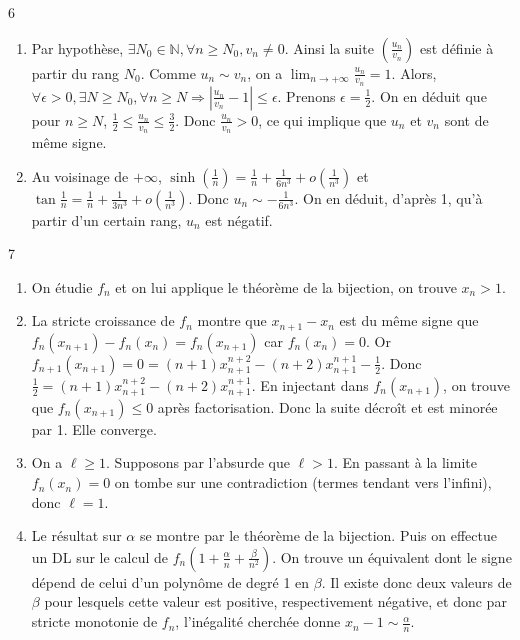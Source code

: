 \begin{correction}{6}
\begin{enumerate}
    \item 
    Par hypothèse, $\exists N_{0}\in\mathbb{N}, \forall n\ge N_{0}, v_{n}\ne0$.
    Ainsi la suite $(\frac{u_{n}}{v_{n}})$ est définie à partir du rang $N_{0}$.
    Comme $u_{n}\sim v_{n}$, on a $\lim_{n\rightarrow+\infty}\frac{u_{n}}{v_{n}}=1$.
    Alors, $\forall\epsilon>0, \exists N\ge N_{0}, \forall n\ge N \Rightarrow |\frac{u_{n}}{v_{n}}-1|\le\epsilon$.
    Prenons $\epsilon=\frac{1}{2}$. On en déduit que pour $n \ge N$, $\frac{1}{2} \le \frac{u_n}{v_n} \le \frac{3}{2}$.
    Donc $\frac{u_{n}}{v_{n}}>0$, ce qui implique que $u_{n}$ et $v_{n}$ sont de même signe.

    \item
    Au voisinage de $+\infty$, $\sinh(\frac{1}{n})=\frac{1}{n}+\frac{1}{6n^{3}}+o(\frac{1}{n^{3}})$ et $\tan\frac{1}{n}=\frac{1}{n}+\frac{1}{3n^{3}}+o(\frac{1}{n^{3}})$.
    Donc $u_{n}\sim -\frac{1}{6n^{3}}$.
    On en déduit, d'après 1, qu'à partir d'un certain rang, $u_{n}$ est négatif.
\end{enumerate}
\end{correction}

\begin{correction}{7}
\begin{enumerate}
    \item On étudie $f_{n}$ et on lui applique le théorème de la bijection, on trouve $x_{n}>1$.

    \item 
    La stricte croissance de $f_{n}$ montre que $x_{n+1}-x_{n}$ est du même signe que $f_{n}(x_{n+1})-f_{n}(x_{n})=f_{n}(x_{n+1})$ car $f_n(x_n)=0$.
    Or $f_{n+1}(x_{n+1})=0=(n+1)x_{n+1}^{n+2}-(n+2)x_{n+1}^{n+1}-\frac{1}{2}$.
    Donc $\frac{1}{2}=(n+1)x_{n+1}^{n+2}-(n+2)x_{n+1}^{n+1}$.
    En injectant dans $f_n(x_{n+1})$, on trouve que $f_{n}(x_{n+1}) \le 0$ après factorisation.
    Donc la suite décroît et est minorée par 1. Elle converge.

    \item On a $\ell\ge1$. Supposons par l'absurde que $\ell>1$. En passant à la limite $f_{n}(x_{n})=0$ on tombe sur une contradiction (termes tendant vers l'infini), donc $\ell=1$.

    \item
    Le résultat sur $\alpha$ se montre par le théorème de la bijection.
    Puis on effectue un DL sur le calcul de $f_{n}(1+\frac{\alpha}{n}+\frac{\beta}{n^{2}})$.
    On trouve un équivalent dont le signe dépend de celui d'un polynôme de degré 1 en $\beta$.
    Il existe donc deux valeurs de $\beta$ pour lesquels cette valeur est positive, respectivement négative, et donc par stricte monotonie de $f_{n}$, l'inégalité cherchée donne $x_{n} - 1 \sim \frac{\alpha}{n}$.
\end{enumerate}
\end{correction}

